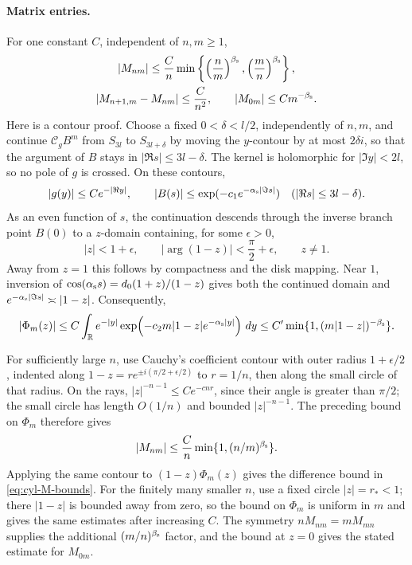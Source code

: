 \paragraph{Matrix entries.}
For one constant \(C\), independent of \(n,m\ge1\),
\begin{equation}\label{eq:cyl-M-bounds}
\begin{gathered}
 |M_{nm}|\le\frac Cn
   \min\left\{\left(\frac nm\right)^{\beta_{\rm s}},
              \left(\frac mn\right)^{\beta_{\rm s}}\right\},
 \\
 |M_{n+1,m}-M_{nm}|\le\frac C{n^2},
 \qquad
 |M_{0m}|\le C m^{-\beta_{\rm s}}.
\end{gathered}
\end{equation}
Here is a contour proof.  Choose a fixed \(0<\delta<l/2\),
independently of \(n,m\), and continue
\(\mathcal C_g B^m\) from \(S_{3l}\) to \(S_{3l+\delta}\) by moving
the \(y\)-contour by at most \(2\delta i\), so that the argument of
\(B\) stays in \(|\Re s|\le3l-\delta\).  The kernel is holomorphic
for \(|\Im y|<2l\), so no pole of \(g\) is crossed.
On these contours,
\[
 |g(y)|\le C e^{-|\Re y|},\qquad
 |B(s)|\le \exp(-c_1e^{-\alpha_{\rm s}|\Im s|})
 \quad (|\Re s|\le3l-\delta).
\]
As an even function of \(s\), the continuation descends through the
inverse branch point \(B(0)\) to a
\(z\)-domain containing, for some \(\epsilon>0\),
\[
 |z|<1+\epsilon,\qquad
 |\arg(1-z)|<\frac{\pi}{2}+\epsilon,\qquad z\ne1.
\]
Away from \(z=1\) this follows by compactness and the disk mapping.
Near \(1\), inversion of
\(\cos(\alpha_{\rm s}s)=d_0(1+z)/(1-z)\) gives both the continued
domain and
\(e^{-\alpha_{\rm s}|\Im s|}\asymp |1-z|\).  Consequently,
\[
 |\Phi_m(z)|
 \le C\int_{\mathbb R}e^{-|y|}
       \exp\!\left(-c_2m|1-z|e^{-\alpha_{\rm s}|y|}\right)\,dy
 \le C'\min\{1,(m|1-z|)^{-\beta_{\rm s}}\}.
\]

For sufficiently large \(n\), use Cauchy's coefficient contour with
outer radius \(1+\epsilon/2\), indented along
\(1-z=r e^{\pm i(\pi/2+\epsilon/2)}\) to \(r=1/n\), then along the
small circle of that radius.  On the rays,
\(|z|^{-n-1}\le C e^{-c n r}\), since their angle is greater than
\(\pi/2\); the small circle has length \(O(1/n)\) and bounded
\(|z|^{-n-1}\).  The preceding bound on \(\Phi_m\) therefore gives
\[
 |M_{nm}|\le\frac Cn\min\{1,(n/m)^{\beta_{\rm s}}\}.
\]
Applying the same contour to \((1-z)\Phi_m(z)\) gives the difference
bound in \eqref{eq:cyl-M-bounds}.  For the finitely many smaller
\(n\), use a fixed circle \(|z|=r_*<1\); there \(|1-z|\) is bounded
away from zero, so the bound on \(\Phi_m\) is uniform in \(m\) and
gives the same estimates after increasing \(C\).  The symmetry
\(nM_{nm}=mM_{mn}\) supplies the additional
\((m/n)^{\beta_{\rm s}}\) factor, and the bound at \(z=0\) gives the
stated estimate for \(M_{0m}\).

